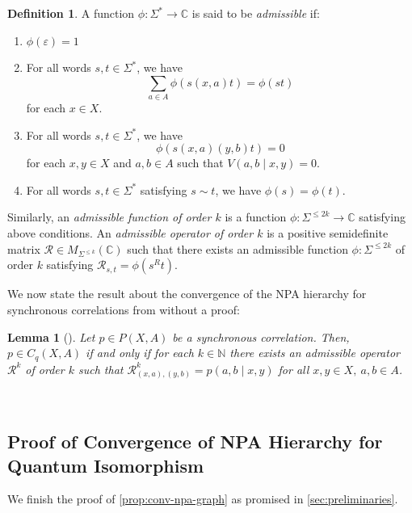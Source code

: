 \documentclass[a4paper,onecolumn,11pt,accepted=2026-01-06]{quantumarticle}
\theoremstyle{plain}
\newtheorem{lem}[thm]{Lemma}
\theoremstyle{remark}
\theoremstyle{definition}
\newtheorem{definition}[thm]{Definition}
\renewcommand{\epsilon}{\varepsilon}
\begin{document}
\begin{definition}
A function $\phi: \Sigma^* \to \mathbb{C}$ is said to be \emph{admissible} if:
\begin{enumerate}
    \item $\phi(\epsilon) = 1$
    \item For all words $s,t \in \Sigma^*$, we have 
    $$\sum_{a \in A}\phi(s(x,a)t) = \phi(st)$$
    for each $x \in X$.
    \item For all words $s,t \in \Sigma^*$, we have 
    $$\phi(s(x,a)(y,b)t) = 0$$
    for each $x,y \in X$ and $a,b \in A$ such that $V(a,b\mid x,y) = 0$.
    \item For all words $s,t \in \Sigma^*$ satisfying $s \sim t$, we have $\phi(s) = \phi(t)$.
\end{enumerate}

Similarly, an \emph{admissible function of order $k$} is a function $\phi: \Sigma^{\leq 2k} \to \mathbb{C}$ satisfying above conditions. An \emph{admissible operator of order $k$} is a positive semidefinite matrix $\mathcal{R} \in M_{\Sigma^{\leq k}}(\mathbb{C})$ such that there exists an admissible function $\phi: \Sigma^{\leq 2k}$ of order $k$ satisfying $\mathcal{R}_{s,t} = \phi(s^Rt).$ 
\end{definition}

We now state the result about the convergence of the NPA hierarchy for synchronous correlations from \cite{russell_synchronous_2023} without a proof: 

\begin{lem}[{\cite[Corollary 2]{russell_synchronous_2023}}]\label{lem:conv-npa-corr}
Let $p \in P(X,A)$ be a synchronous correlation. Then, $p \in C_q(X,A)$ if and only if for each $k \in \mathbb{N}$ there exists an admissible operator $\mathcal{R}^k$ of order $k$ such that $\mathcal{R}^k_{(x,a), (y,b)} = p(a,b\mid x,y)$ for all $x,y \in X, \ a,b \in A$.
\end{lem} \

\subsection{Proof of Convergence of NPA Hierarchy for Quantum Isomorphism}

We finish the proof of \ref{prop:conv-npa-graph} as promised in \cref{sec:preliminaries}. 
\end{document}
